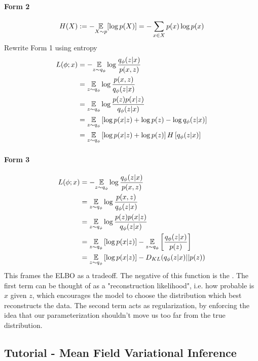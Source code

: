 \documentclass[11pt]{article}
\begin{document}
\paragraph{Form 2}
$$H(X) := -\underset{X\sim p}{\mathbb{E}}[\log p(X)] = -\sum_{x \in X}p(x) \log p(x)$$
Rewrite Form 1 using entropy
\begin{align*}
	L(\phi; x) &= - \underset{z\sim q_\phi}{\mathbb{E}} \log \frac{q_\phi(z|x)}{p(x,z)}\\
	&= \underset{z\sim q_\phi}{\mathbb{E}} \log \frac{p(x,z)}{q_\phi(z|x)} \\
	&= \underset{z\sim q_\phi}{\mathbb{E}} \log \frac{p(z)p(x|z)}{q_\phi(z|x)} \\
	&= \underset{z\sim q_\phi}{\mathbb{E}} \left[ \log p(x|z) + \log p(z) - \log q_\phi(z|x)\right] \\
	&= \underset{z\sim q_\phi}{\mathbb{E}} \left[ \log p(x|z) + \log p(z)\right] H\left[ q_\phi(z|x) \right]
\end{align*}

\paragraph{Form 3}
\begin{align*}
	L(\phi; x) &= - \underset{z\sim q_\phi}{\mathbb{E}} \log \frac{q_\phi(z|x)}{p(x,z)}\\
	&= \underset{z\sim q_\phi}{\mathbb{E}} \log \frac{p(x,z)}{q_\phi(z|x)} \\
	&= \underset{z\sim q_\phi}{\mathbb{E}} \log \frac{p(z)p(x|z)}{q_\phi(z|x)} \\
	&= \underset{z\sim q_\phi}{\mathbb{E}} \left[ \log p(x|z)\right] -\underset{z\sim q_\phi}{\mathbb{E}} \left[ \frac{q_\phi(z|x)}{p(z)} \right] \\
	&= \underset{z\sim q_\phi}{\mathbb{E}} \left[ \log p(x|z)\right] -D_{KL}(q_\phi(z|x)||p(z))
\end{align*}
This frames the ELBO as a tradeoff. The negative of this function is the . The first term can be thought of as a "reconstruction likelihood", i.e. how probable is $x$ given $z$, which encourages the model to choose the distribution which best reconstructs the data. The second term acts as regularization, by enforcing the idea that our parameterization shouldn't move us too far from the true distribution.

\subsection{Tutorial - Mean Field Variational Inference}
\end{document}
